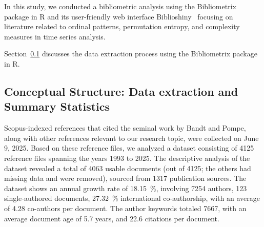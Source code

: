 In this study, we conducted a bibliometric analysis using the Bibliometrix package in R and its user-friendly web interface Biblioshiny~\cite{Aria2017} focusing on literature related to ordinal patterns, permutation entropy, and complexity measures in time series analysis. 

Section~\ref{Subsec:Dataextraction} discusses the data extraction process using the Bibliometrix package in R.

\subsection{Conceptual Structure: Data extraction and Summary Statistics}\label{Subsec:Dataextraction}

Scopus-indexed references that cited the seminal work by Bandt and Pompe, along with other references relevant to our research topic, were collected on June 9, 2025.
Based on these reference files, we analyzed a dataset consisting of 4125 reference files spanning the years 1993 to 2025. %
The descriptive analysis of the dataset revealed a total of 4063 usable documents (out of 4125; the others had missing data and were removed), sourced from 1317 
publication sources. 
The dataset shows an annual growth rate of \SI{18.15}{\percent}, %
involving 7254 authors, 
123 single-authored documents, 
\SI{27.32}{\percent} international co-authorship, 
with an average of 4.28 co-authors per document. 
The author keywords totaled 7667, 
with an average document age of 5.7 years, %
and 22.6 citations per document. 

